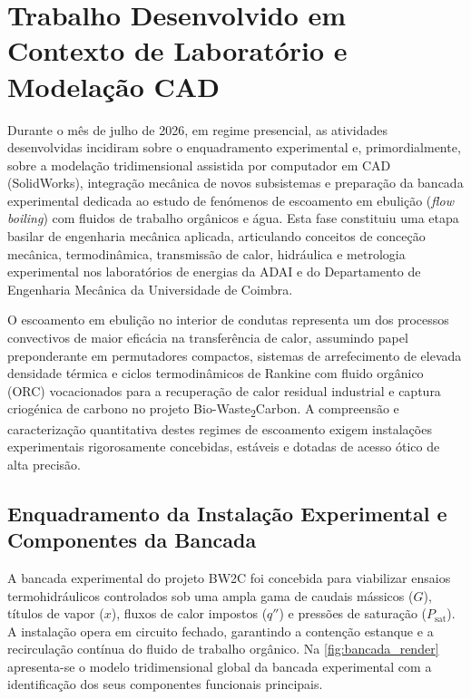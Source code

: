 \section{Trabalho Desenvolvido em Contexto de Laboratório e Modelação CAD}
\label{sec:laboratorio}

Durante o mês de julho de 2026, em regime presencial, as atividades desenvolvidas incidiram sobre o enquadramento experimental e, primordialmente, sobre a modelação tridimensional assistida por computador em CAD (SolidWorks\textregistered), integração mecânica de novos subsistemas e preparação da bancada experimental dedicada ao estudo de fenómenos de escoamento em ebulição (\emph{flow boiling}) com fluidos de trabalho orgânicos e água. Esta fase constituiu uma etapa basilar de engenharia mecânica aplicada, articulando conceitos de conceção mecânica, termodinâmica, transmissão de calor, hidráulica e metrologia experimental nos laboratórios de energias da ADAI e do Departamento de Engenharia Mecânica da Universidade de Coimbra.

O escoamento em ebulição no interior de condutas representa um dos processos convectivos de maior eficácia na transferência de calor, assumindo papel preponderante em permutadores compactos, sistemas de arrefecimento de elevada densidade térmica e ciclos termodinâmicos de Rankine com fluido orgânico (ORC) vocacionados para a recuperação de calor residual industrial e captura criogénica de carbono no projeto Bio-Waste\textsubscript{2}Carbon. A compreensão e caracterização quantitativa destes regimes de escoamento exigem instalações experimentais rigorosamente concebidas, estáveis e dotadas de acesso ótico de alta precisão.

\subsection{Enquadramento da Instalação Experimental e Componentes da Bancada}
\label{subsec:concecao_bancada}

A bancada experimental do projeto BW2C foi concebida para viabilizar ensaios termohidráulicos controlados sob uma ampla gama de caudais mássicos ($G$), títulos de vapor ($x$), fluxos de calor impostos ($q''$) e pressões de saturação ($P_{\text{sat}}$). A instalação opera em circuito fechado, garantindo a contenção estanque e a recirculação contínua do fluido de trabalho orgânico. Na \autoref{fig:bancada_render} apresenta-se o modelo tridimensional global da bancada experimental com a identificação dos seus componentes funcionais principais.

